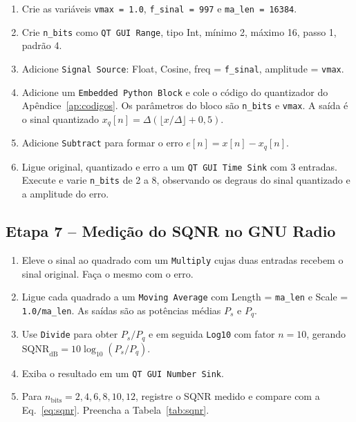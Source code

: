\documentclass[11pt,a4paper]{article}
\begin{document}
\begin{instrucao}
\begin{enumerate}[label=\arabic*.]
  \item Crie as variáveis \texttt{vmax = 1.0}, \texttt{f\_sinal = 997} e
    \texttt{ma\_len = 16384}.
  \item Crie \texttt{n\_bits} como \texttt{QT GUI Range}, tipo Int, mínimo 2,
    máximo 16, passo 1, padrão 4.
  \item Adicione \texttt{Signal Source}: Float, Cosine, freq = \texttt{f\_sinal},
    amplitude = \texttt{vmax}.
  \item Adicione um \texttt{Embedded Python Block} e cole o código do
    quantizador do Apêndice~\ref{ap:codigos}. Os parâmetros do bloco são
    \texttt{n\_bits} e \texttt{vmax}. A saída é o sinal quantizado
    $x_q[n] = \Delta\left(\lfloor x/\Delta\rfloor + 0{,}5\right)$.
  \item Adicione \texttt{Subtract} para formar o erro $e[n]=x[n]-x_q[n]$.
  \item Ligue original, quantizado e erro a um \texttt{QT GUI Time Sink} com
    3 entradas. Execute e varie \texttt{n\_bits} de 2 a 8, observando os
    degraus do sinal quantizado e a amplitude do erro.
\end{enumerate}
\end{instrucao}

\subsection*{Etapa 7 -- Medição do SQNR no GNU Radio}

\begin{instrucao}
\begin{enumerate}[label=\arabic*.]
  \item Eleve o sinal ao quadrado com um \texttt{Multiply} cujas duas
    entradas recebem o sinal original. Faça o mesmo com o erro.
  \item Ligue cada quadrado a um \texttt{Moving Average} com Length
    = \texttt{ma\_len} e Scale = \texttt{1.0/ma\_len}. As saídas são as
    potências médias $P_s$ e $P_q$.
  \item Use \texttt{Divide} para obter $P_s/P_q$ e em seguida \texttt{Log10}
    com fator $n = 10$, gerando $\text{SQNR}_\text{dB}=10\log_{10}(P_s/P_q)$.
  \item Exiba o resultado em um \texttt{QT GUI Number Sink}.
  \item Para $n_\text{bits} = 2,4,6,8,10,12$, registre o SQNR medido e
    compare com a Eq.~\eqref{eq:sqnr}. Preencha a Tabela~\ref{tab:sqnr}.
\end{enumerate}
\end{instrucao}
\end{document}
